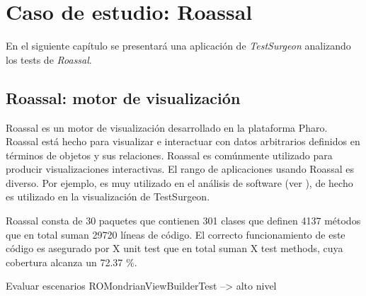 \chapter{Caso de estudio: Roassal}

\par En el siguiente capítulo se presentará una aplicación de \emph{TestSurgeon} analizando los tests de \emph{Roassal}. 

\section{Roassal: motor de visualización}

\par Roassal es un motor de visualización desarrollado en la plataforma Pharo. Roassal está hecho para visualizar e interactuar con datos arbitrarios definidos en términos de objetos y sus relaciones. Roassal es comúnmente utilizado para producir visualizaciones interactivas. El rango de aplicaciones usando Roassal es diverso. Por ejemplo, es muy utilizado en el análisis de software (ver ), de hecho es utilizado en la visualización de TestSurgeon.

\par Roassal consta de 30 paquetes que contienen 301 clases que definen 4137 métodos que en total suman 29720 líneas de código. El correcto funcionamiento de este código es asegurado por X unit test que en total suman X test methods, cuya cobertura alcanza un 72.37 \%.



Evaluar escenarios
ROMondrianViewBuilderTest --> alto nivel